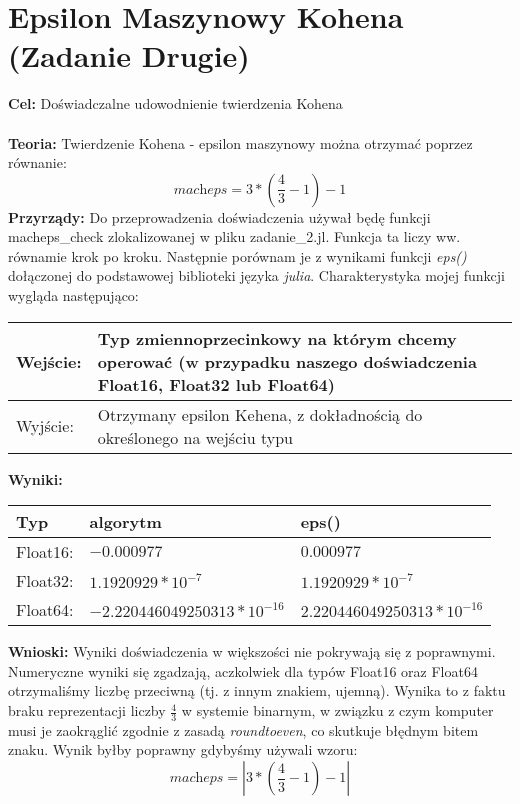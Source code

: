 \documentclass{article}
\begin{document}
\section{Epsilon Maszynowy Kohena (Zadanie Drugie)}
\noindent \textbf{Cel:} Doświadczalne udowodnienie twierdzenia Kohena\\\\
\noindent \textbf{Teoria:} Twierdzenie Kohena - epsilon maszynowy można otrzymać poprzez równanie:
$$\textit{macheps} = 3* (\frac{4}{3} - 1) - 1$$
\noindent \textbf{Przyrządy:} Do przeprowadzenia doświadczenia używał będę funkcji macheps\_check zlokalizowanej w pliku zadanie\_2.jl. Funkcja ta liczy ww. równamie krok po kroku. Następnie porównam je z wynikami funkcji \textit{eps()} dołączonej do podstawowej biblioteki języka \textit{julia}. Charakterystyka mojej funkcji wygląda następująco:\\
\begin{center}
  \begin{tabular}{|p{3cm}|p{8cm}|} \hline
    Wejście: & Typ zmiennoprzecinkowy na którym chcemy operować (w przypadku naszego doświadczenia Float16, Float32 lub Float64) \\
    \hline \hline
    Wyjście: & Otrzymany epsilon Kehena, z dokładnością do określonego na wejściu typu \\
    \hline
  \end{tabular}
\end{center}
\noindent \textbf{Wyniki:}
\begin{center}
  \begin{tabular}{|p{}|p{}|p{}|} \hline
    \textbf{Typ} & \textbf{algorytm} & \textbf{eps()} \\
    \hline
    Float16: & $-0.000977$ & $0.000977$ \\
    \hline
    Float32: & $1.1920929 * 10^{-7}$ & $1.1920929 * 10^{-7}$ \\
    \hline
    Float64: & $-2.220446049250313 * 10^{-16}$ & $2.220446049250313 * 10^{-16}$ \\
    \hline
  \end{tabular}
\end{center}
\noindent \textbf{Wnioski:} Wyniki doświadczenia w większości nie pokrywają się z poprawnymi. Numeryczne wyniki się zgadzają, aczkolwiek dla typów Float16 oraz Float64 otrzymaliśmy liczbę przeciwną (tj. z innym znakiem, ujemną). Wynika to z faktu braku reprezentacji liczby $\frac{4}{3}$ w systemie binarnym, w związku z czym komputer musi je zaokrąglić zgodnie z zasadą \textit{roundtoeven}, co skutkuje błędnym bitem znaku. Wynik byłby poprawny gdybyśmy używali wzoru:
$$\textit{macheps} = |3* (\frac{4}{3} - 1) - 1|$$
\end{document}
